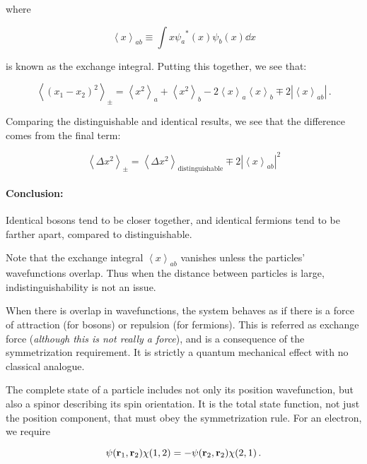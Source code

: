 \documentclass[12pt, titlepage]{article}
\newcommand{\exv}[1]{\left\langle #1 \right\rangle}
\begin{document}
where

\begin{equation*}
	\exv{x}_{ab} \equiv \int x {\psi_a}^*(x)\psi_b(x)\dd{x}
\end{equation*}

is known as the exchange integral. Putting this together, we see that:

\begin{equation}
	\exv{(x_1-x_2)^2}_\pm = \exv{x^2}_a + \exv{x^2}_b - 2\exv{x}_a\exv{x}_b \mp 2|\exv{x}_{ab}| \,.
\end{equation}

Comparing the distinguishable and identical results, we see that the difference comes from the final term:

\begin{equation}
	\exv{\Delta x^2}_\pm = \exv{\Delta x^2}_{\text{distinguishable}} \mp 2|\exv{x}_{ab}|^2
\end{equation}

\begin{mdframed}
\paragraph*{Conclusion:}
Identical bosons tend to be closer together, and identical fermions tend to be farther apart, compared to distinguishable.

Note that the exchange integral $\exv{x}_{ab}$ vanishes unless the particles' wavefunctions overlap. Thus when the distance between particles is large, indistinguishability is not an issue.
\end{mdframed}

When there is overlap in wavefunctions, the system behaves as if there is a force of attraction (for bosons) or repulsion (for fermions). This is referred as exchange force (\textit{although this is not really a force}), and is a consequence of the symmetrization requirement. It is strictly a quantum mechanical effect with no classical analogue.

The complete state of a particle includes not only its position wavefunction, but also a spinor describing its spin orientation. It is the total state function, not just the position component, that must obey the symmetrization rule. For an electron, we require

\begin{equation}
	\psi(\vb{r}_1,\vb{r}_2)\chi(1,2) = -\psi(\vb{r}_2,\vb{r}_2)\chi(2,1) \,.
\end{equation}
\end{document}
